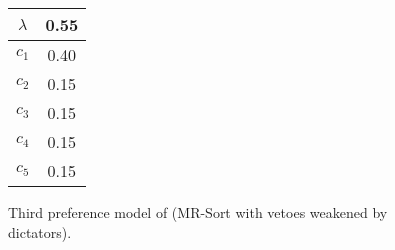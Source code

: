 \begin{figure}
\begin{minipage}[c]{0.07\columnwidth}
\begin{tabular}{c|c}
$\lambda$ & 0.55 \\\hline
$c_1$ & 0.40 \\
$c_2$ & 0.15 \\
$c_3$ & 0.15 \\
$c_4$ & 0.15 \\
$c_5$ & 0.15
\end{tabular}
\end{minipage}

\caption{Third preference model of \DB (MR-Sort with vetoes weakened by dictators).}\label{fig:ex2-model3}
\end{figure}